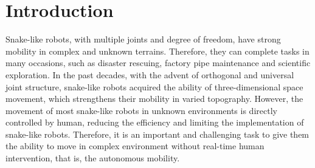 \section{Introduction}
Snake-like robots, with multiple joints and degree of freedom, 
have strong mobility in complex and unknown terrains\cite{Chirikjian1995The}. 
Therefore, they can complete tasks in many occasions, such as disaster 
rescuing\cite{DogAndSnake}, factory pipe maintenance\cite{ACMTutorial} 
and scientific exploration\cite{Kuwada2007Snake}. In the past decades, 
with the advent of orthogonal and universal joint structure\cite{1014757}\cite{Date2005Control}\cite{GaitBasedCompliant}, 
snake-like robots acquired the ability of three-dimensional space movement, 
which strengthens their mobility in varied topography. 
However, the movement of most snake-like robots in unknown environments is 
directly controlled by human, reducing the efficiency and limiting the 
implementation of snake-like robots. Therefore, it is an important and challenging 
task to give them the ability to move in complex environment
without real-time human intervention, that is, the autonomous mobility.


